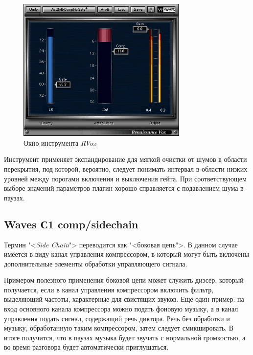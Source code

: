 \documentclass[oneside, final, 14pt]{extreport}
\begin{document}
\begin{figure}[ht!]
  \centering
  \includegraphics[width=0.75\textwidth]{pic-wavescomp-05}
  \caption{Окно инструмента \emph{RVox}}
  \label{pic-wavescomp-05}
\end{figure}

Инструмент применяет экспандирование для мягкой очистки от шумов в области перекрытия, под которой, вероятно, следует понимать интервал в области низких уровней между порогами включения и выключения гейта. При соответствующем выборе значений параметров плагин хорошо справляется с подавлением шума в паузах.

\subsection{Waves С1 comp/sidechain}
Термин "<\emph{Side Chain}"> переводится как "<боковая цепь">. В данном случае имеется в виду канал управления компрессором, в который могут быть включены дополнительные элементы обработки управляющего сигнала.

Примером полезного применения боковой цепи может служить диэсер, который получается, если в канал управления компрессором включить фильтр, выделяющий частоты, характерные для свистящих звуков. Еще один пример: на вход основного канала компрессора можно подать фоновую музыку, а в канал управления подать сигнал, содержащий речь диктора. Речь без обработки и музыку, обработанную таким компрессором, затем следует смикшировать. В итоге получится, что в паузах музыка будет звучать с нормальной громкостью, а во время разговора будет автоматически приглушаться.
\end{document}
